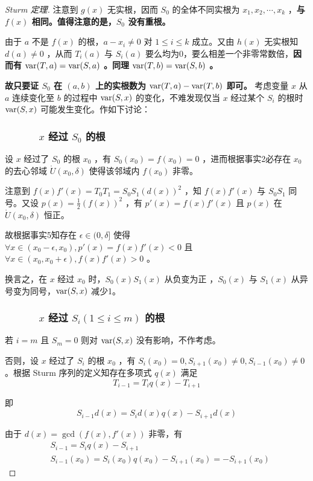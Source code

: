 \begin{proof}[Sturm 定理]
		注意到 $g(x)$ 无实根，因而 $S_0$ 的全体不同实根为 $x_1, x_2, \cdots, x_k$ ，\textbf{与 $f(x)$ 相同。值得注意的是，$S_0$ 没有重根。}
		
		由于 $a$ 不是 $f(x)$ 的根，$a - x_i \neq 0$ 对 $1 \le i \le k$ 成立。又由 $h(x)$ 无实根知 $d(a) \neq 0$ ，从而 $T_i(a)$ 与 $S_i(a)$ 要么均为0，要么相差一个非零常数倍，\textbf{因而有 $\mathrm{var}(T, a) = \mathrm{var}(S, a)$ 。同理 $\mathrm{var}(T, b) = \mathrm{var}(S, b)$ 。}
		
		\textbf{故只要证 $S_0$ 在 $(a, b)$ 上的实根数为 $\mathrm{var}(T, a) - \mathrm{var}(T, b)$ 即可。} 考虑变量 $x$ 从 $a$ 连续变化至 $b$ 的过程中 $\mathrm{var}(S, x)$ 的变化，不难发现仅当 $x$ 经过某个 $S_i$ 的根时 $\mathrm{var}(S, x)$ 可能发生变化。作如下讨论：
		
		\subsubsection*{\ \ \ \ \ \ $x$ 经过 $S_0$ 的根}
			
			设 $x$ 经过了 $S_0$ 的根 $x_0$ ，有 $S_0(x_0) = f(x_0) = 0$ ，进而根据事实2必存在 $x_0$ 的去心邻域 $\mathring{U}(x_0, \delta)$ 使得该邻域内 $f(x_0)$ 非零。
			
			注意到 $f(x)f'(x) = T_0T_1 = S_0S_1(d(x))^2$ ，知 $f(x)f'(x)$ 与 $S_0S_1$ 同号。又设 $p(x) = \frac{1}{2}(f(x))^2$ ，有 $p'(x) = f(x)f'(x)$ 且 $p(x)$ 在 $\mathring{U}(x_0, \delta)$ 恒正。
			
			故根据事实5知存在 $\epsilon \in (0, \delta] $ 使得 $\forall x \in (x_0 - \epsilon, x_0), p'(x) = f(x)f'(x) < 0$ 且 $\forall x \in (x_0, x_0 + \epsilon), f(x)f'(x) > 0$ 。
			
			换言之，在 $x$ 经过 $x_0$ 时，$S_0(x)S_1(x)$ 从负变为正			，$S_0(x)$ 与 $S_1(x)$ 从异号变为同号，$\mathrm{var}(S, x)$ 减少1。
		 
		\subsubsection*{\ \ \ \ \ \ $x$ 经过 $S_i (1 \le i \le m)$ 的根}
		
			若 $i = m$ 且 $S_m = 0$ 则对 $\mathrm{var}(S, x)$ 没有影响，不作考虑。
			
			否则，设 $x$ 经过了 $S_i$ 的根 $x_0$ ，有 $S_i(x_0) = 0, S_{i + 1}(x_0) \neq 0, S_{i - 1}(x_0) \neq 0$ 。根据 Sturm 序列的定义知存在多项式 $q(x)$ 满足
			$$
			T_{i - 1} = T_iq(x) - T_{i + 1}
			$$
			
			即
			$$
			S_{i - 1}d(x) = S_id(x)q(x) - S_{i + 1}d(x)
			$$
			
			由于 $d(x) = \gcd(f(x), f'(x))$ 非零，有
			$$
			\begin{aligned}
			& S_{i - 1} = S_iq(x)- S_{i + 1} \\
			& S_{i - 1}(x_0) = S_i(x_0)q(x_0) - S_{i + 1}(x_0) = -S_{i + 1}(x_0) 
			\end{aligned}
			$$
			

\end{proof}
